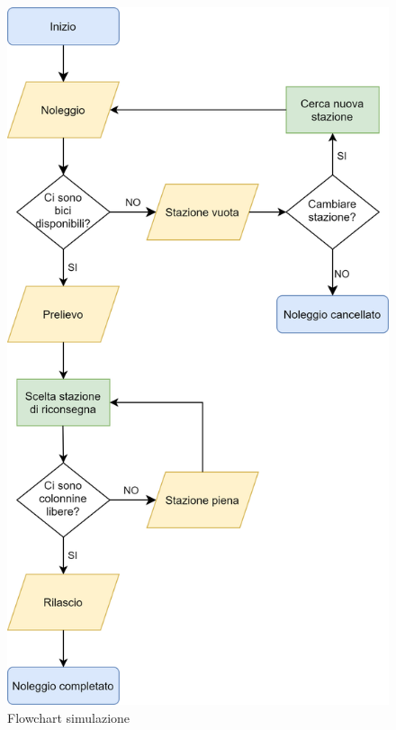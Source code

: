 \documentclass[a4paper, 12pt]{article}
\begin{document}
		\begin{figure}
		\caption{Flowchart simulazione}
		\label{flowchart}
		\hfill \includegraphics[height=\textheight]{resources/images/FlowChart.png} \hspace*{\fill}
		\end{figure}	

\newpage

\end{document}
